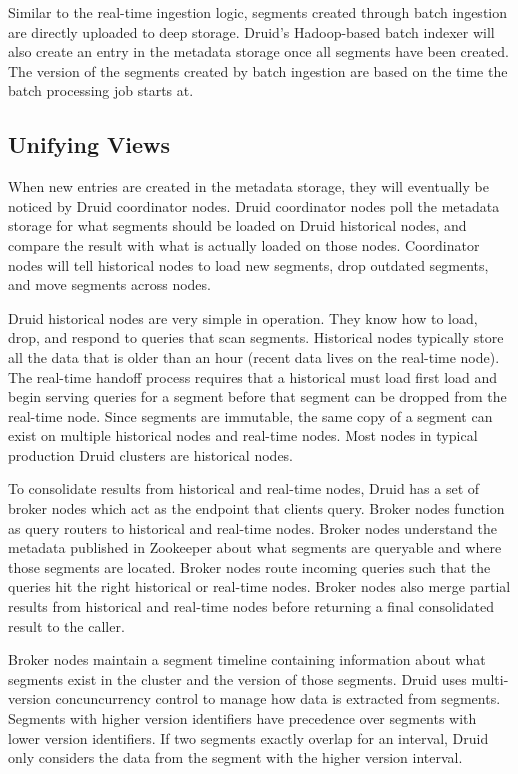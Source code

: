 \documentclass{vldb}
\begin{document}
Similar to the real-time ingestion logic, segments created through batch
ingestion are directly uploaded to deep storage. Druid’s Hadoop-based batch
indexer will also create an entry in the metadata storage once all segments
have been created. The version of the segments created by batch ingestion are
based on the time the batch processing job starts at.

\subsection{Unifying Views}
When new entries are created in the metadata storage, they will eventually be
noticed by Druid coordinator nodes. Druid coordinator nodes poll the metadata
storage for what segments should be loaded on Druid historical nodes, and
compare the result with what is actually loaded on those nodes. Coordinator
nodes will tell historical nodes to load new segments, drop outdated segments,
and move segments across nodes.

Druid historical nodes are very simple in operation. They know how to load,
drop, and respond to queries that scan segments. Historical nodes typically
store all the data that is older than an hour (recent data lives on the
real-time node). The real-time handoff process requires that a historical must
load first load and begin serving queries for a segment before that segment can
be dropped from the real-time node. Since segments are immutable, the same copy
of a segment can exist on multiple historical nodes and real-time nodes. Most
nodes in typical production Druid clusters are historical nodes.

To consolidate results from historical and real-time nodes, Druid has a set of
broker nodes which act as the endpoint that clients query. Broker nodes
function as query routers to historical and real-time nodes. Broker nodes
understand the metadata published in Zookeeper about what segments are
queryable and where those segments are located. Broker nodes route incoming
queries such that the queries hit the right historical or real-time nodes.
Broker nodes also merge partial results from historical and real-time nodes
before returning a final consolidated result to the caller.

Broker nodes maintain a segment timeline containing information about what
segments exist in the cluster and the version of those segments. Druid uses
multi-version concuncurrency control to manage how data is extracted from
segments. Segments with higher version identifiers have precedence over
segments with lower version identifiers. If two segments exactly overlap for an
interval, Druid only considers the data from the segment with the higher
version interval.
\end{document}
